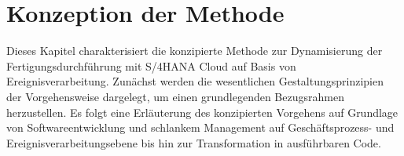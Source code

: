 \chapter{Konzeption der Methode}\label{ch:Methode}
Dieses Kapitel charakterisiert die konzipierte Methode zur Dynamisierung der Fertigungsdurchführung mit S/4HANA Cloud auf Basis von Ereignisverarbeitung.
Zunächst werden die wesentlichen Gestaltungsprinzipien der Vorgehensweise dargelegt, um einen grundlegenden Bezugsrahmen herzustellen.
Es folgt eine Erläuterung des konzipierten Vorgehens auf Grundlage von Softwareentwicklung und schlankem Management auf Geschäftsprozess- und Ereignisverarbeitungsebene bis hin zur Transformation in ausführbaren Code.

